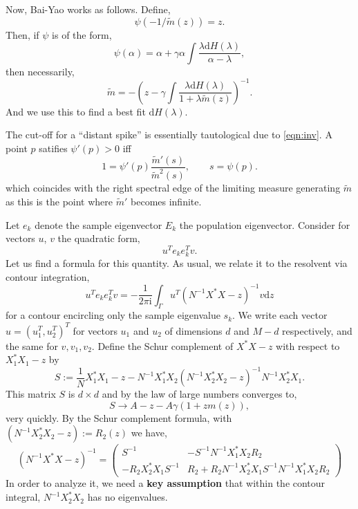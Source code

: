 \documentclass[11 pt, reqno]{article}
\def\beq{\begin{equation}}
\def\eeq{\end{equation}}
\def\i{\mathrm{i}}
\def\d{\mathrm{d}}
\begin{document}
Now, Bai-Yao works as follows.  Define,
\beq \label{eqn:inv}
\psi (-1 /\tilde{m}(z) ) = z.
\eeq
Then, if $\psi$ is of the form, 
\beq
\psi ( \alpha ) = \alpha + \gamma \alpha \int \frac{ \lambda \d H ( \lambda ) }{ \alpha - \lambda },
\eeq
then necessarily,
\beq
\tilde{m} = -  \left( z - \gamma \int \frac{ \lambda \d H ( \lambda ) }{ 1 + \lambda \tilde{m} (z) } \right)^{-1}.
\eeq
And we use this to find a best fit $\d H( \lambda)$.

The cut-off for a ``distant spike'' is essentially tautological due to \eqref{eqn:inv}.  A point $p$ satifies $\psi' (p) >0$ iff
\beq
1 = \psi' (p  )\frac{ \tilde{m}' (s) }{ \tilde{m}^2 (s) }, \qquad s = \psi (p).
\eeq
which coincides with the right spectral edge of the limiting measure generating $\tilde{m}$ as this is the point where $\tilde{m}'$ becomes infinite.



Let $e_k$ denote the sample eigenvector $E_k$ the population eigenvector.  Consider for vectors $u$, $v$ the quadratic form,
\beq
u^T e_k e_k^T v.
\eeq
Let us find a formula for this quantity.  As usual, we relate it to the resolvent via contour integration,
\beq
u^T e_k e_k^T v = - \frac{1}{ 2 \pi \i } \int_{\Gamma} u^T ( N^{-1} X^* X - z )^{-1} v \d z
\eeq
for a contour encircling only the sample eigenvalue $s_k$.  We write each vector $u = (u_1^T, u_2^T)^T$ for vectors $u_1$ and $u_2$ of dimensions $d$ and $M-d$ respectively, and the same for $v, v_1, v_2$.   Define the Schur complement of $X^* X-z$ with respect to $X_1^*X_1 - z$ by
\beq
S:= \frac{1}{N} X_1^*X_1 - z  -  N^{-1} X_1^* X_2 ( N^{-1} X_2^* X_2 - z )^{-1} N^{-1} X_2^* X_1 .
\eeq
This matrix $S$ is $d \times d$ and by the law of large numbers converges to,
\beq
 S \to A - z - A \gamma (1 + z m ( z) ),
\eeq
very quickly.  By the Schur complement formula, with $(N^{-1} X_2^* X_2 -z ) := R_2 (z)$ we have,
\beq
(N^{-1} X^* X - z )^{-1} = \left( \begin{matrix} S^{-1} & - S^{-1} N^{-1} X_1^* X_2 R_2 \\ - R_2  X_2^* X_1 S^{-1} & R_2+ R_2 N^{-1} X_2^* X_1 S^{-1} N^{-1} X_1^* X_2R_2 \end{matrix} \right)
\eeq
In order to analyze it, we need a {\bf key assumption} that within the contour integral, $N^{-1} X_2^* X_2$ has no eigenvalues.
\end{document}
